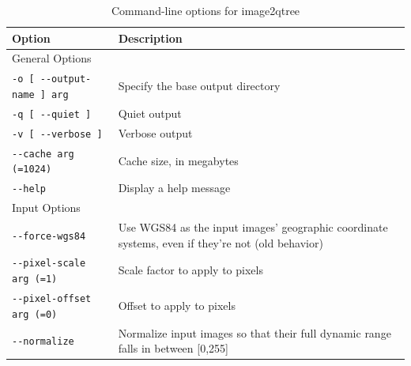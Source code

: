 \begin{longtable}{|l|p{7.5cm}|}
\caption{Command-line options for image2qtree}
\label{tbl:image2qtree}
\endfirsthead
\endhead
\endfoot
\endlastfoot
\hline
Option & Description \\ \hline \hline
General Options \\ \hline
\verb#-o [ --output-name ] arg# & Specify the base output directory\\ \hline
\verb#-q [ --quiet ]# & Quiet output\\ \hline
\verb#-v [ --verbose ]# & Verbose output\\ \hline
\verb#--cache arg (=1024)# & Cache size, in megabytes\\ \hline
\verb#--help# & Display a help message\\ \hline

Input Options\\ \hline
\verb#--force-wgs84# & Use WGS84 as the input images' geographic coordinate systems, even if they're not (old behavior)\\ \hline
\verb#--pixel-scale arg (=1)# & Scale factor to apply to pixels\\ \hline
\verb#--pixel-offset arg (=0)# & Offset to apply to pixels\\ \hline
\verb#--normalize# & Normalize input images so that their full dynamic range falls in between [0,255]\\ \hline


\end{longtable}
